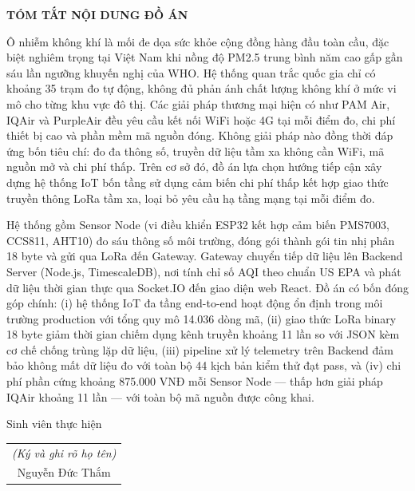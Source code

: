 \documentclass[../DoAn.tex]{subfiles}
\begin{document}
\begin{center}
    \Large{\textbf{TÓM TẮT NỘI DUNG ĐỒ ÁN}}\\
\end{center}
\vspace{1cm}
Ô nhiễm không khí là mối đe dọa sức khỏe cộng đồng hàng đầu toàn cầu, đặc biệt nghiêm trọng tại Việt Nam khi nồng độ PM2.5 trung bình năm cao gấp gần sáu lần ngưỡng khuyến nghị của WHO. Hệ thống quan trắc quốc gia chỉ có khoảng 35 trạm đo tự động, không đủ phản ánh chất lượng không khí ở mức vi mô cho từng khu vực đô thị. Các giải pháp thương mại hiện có như PAM Air, IQAir và PurpleAir đều yêu cầu kết nối WiFi hoặc 4G tại mỗi điểm đo, chi phí thiết bị cao và phần mềm mã nguồn đóng. Không giải pháp nào đồng thời đáp ứng bốn tiêu chí: đo đa thông số, truyền dữ liệu tầm xa không cần WiFi, mã nguồn mở và chi phí thấp. Trên cơ sở đó, đồ án lựa chọn hướng tiếp cận xây dựng hệ thống IoT bốn tầng sử dụng cảm biến chi phí thấp kết hợp giao thức truyền thông LoRa tầm xa, loại bỏ yêu cầu hạ tầng mạng tại mỗi điểm đo.

Hệ thống gồm Sensor Node (vi điều khiển ESP32 kết hợp cảm biến PMS7003, CCS811, AHT10) đo sáu thông số môi trường, đóng gói thành gói tin nhị phân 18 byte và gửi qua LoRa đến Gateway. Gateway chuyển tiếp dữ liệu lên Backend Server (Node.js, TimescaleDB), nơi tính chỉ số AQI theo chuẩn US EPA và phát dữ liệu thời gian thực qua Socket.IO đến giao diện web React. Đồ án có bốn đóng góp chính: (i) hệ thống IoT đa tầng end-to-end hoạt động ổn định trong môi trường production với tổng quy mô 14.036 dòng mã, (ii) giao thức LoRa binary 18 byte giảm thời gian chiếm dụng kênh truyền khoảng 11 lần so với JSON kèm cơ chế chống trùng lặp dữ liệu, (iii) pipeline xử lý telemetry trên Backend đảm bảo không mất dữ liệu đo với toàn bộ 44 kịch bản kiểm thử đạt pass, và (iv) chi phí phần cứng khoảng 875.000 VNĐ mỗi Sensor Node — thấp hơn giải pháp IQAir khoảng 11 lần — với toàn bộ mã nguồn được công khai.
\begin{flushright}
Sinh viên thực hiện\\
\begin{tabular}{@{}c@{}}
\textit{(Ký và ghi rõ họ tên)}\\[1.5cm]
Nguyễn Đức Thắm
\end{tabular}
\end{flushright}
\end{document}
